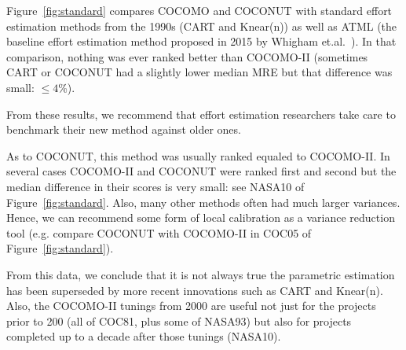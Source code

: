 \documentclass[smallcondesed]{svjour3}
\newcommand{\fig}[1]{Figure~\ref{fig:#1}}
\newenvironment{BLUE}{\color{blue}}{\ignorespacesafterend}
\newcommand{\quart}[4]{\begin{picture}(100,4)%
{\color{black}\put(#3,2){\circle*{4}}\put(#1,2){\line(1,0){#2}}}\end{picture}}
\begin{document}
\fig{standard} compares COCOMO and COCONUT with  
standard effort estimation methods
from the 1990s (CART and Knear(n))
\begin{BLUE}
  as well as  ATML (the baseline effort estimation method
  proposed in 2015 by Whigham et.al.~\cite{whigham15}).
  \end{BLUE}
In that comparison, nothing was ever ranked better than COCOMO-II
(sometimes
CART or COCONUT had a slightly lower median MRE but that difference was small: $\le 4$\%).


From these results,
we recommend that effort estimation researchers take care to benchmark
their new method against older ones.




As to COCONUT, this method
was usually ranked equaled to COCOMO-II.  
In several cases  COCOMO-II and COCONUT were ranked first and second but
the median difference in their scores is very small: see
NASA10 of \fig{standard}.
Also,
many other methods often had much larger variances. 
Hence,  we can recommend some form of local calibration as a variance reduction tool
(e.g. compare COCONUT with COCOMO-II in COC05 of \fig{standard}).


From this data, we conclude that it is not
always true the parametric estimation has been
superseded by more recent innovations such
as CART and Knear(n). Also, the COCOMO-II tunings from 2000
are useful not just for the projects prior to 200
(all of COC81, plus some of NASA93)
but also for projects completed up to a decade after
those tunings (NASA10).






\end{document}
